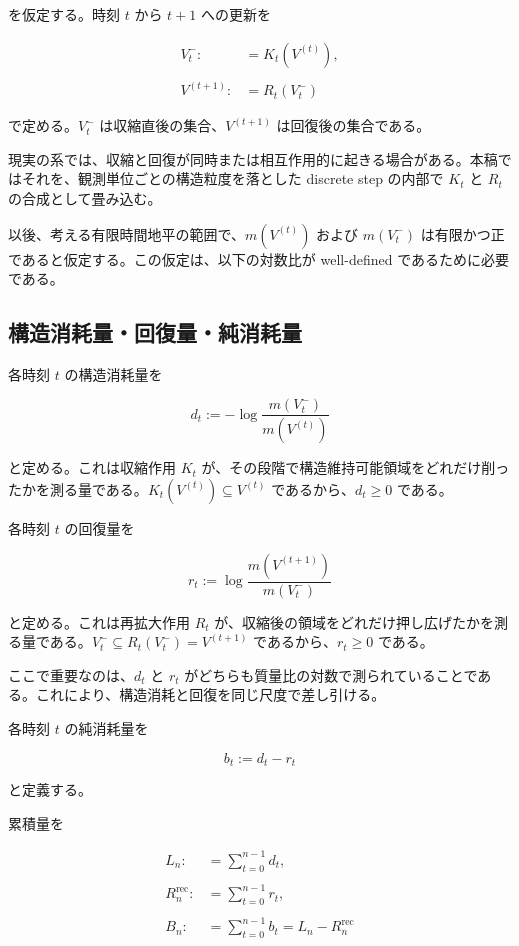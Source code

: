 \documentclass[12pt,a4paper]{article}
\begin{document}
を仮定する。時刻 \(t\) から \(t+1\) への更新を

\[
\begin{aligned}
V_{t}^- :&= K_{t}(V^{(t)}), \\
\qquad \\
V^{(t+1)} :&= R_{t}(V_{t}^-)
\end{aligned}
\]

で定める。\(V_{t}^-\) は収縮直後の集合、\(V^{(t+1)}\) は回復後の集合である。

現実の系では、収縮と回復が同時または相互作用的に起きる場合がある。本稿ではそれを、観測単位ごとの構造粒度を落とした discrete step の内部で \(K_{t}\) と \(R_{t}\) の合成として畳み込む。

以後、考える有限時間地平の範囲で、\(m(V^{(t)})\) および \(m(V_{t}^-)\) は有限かつ正であると仮定する。この仮定は、以下の対数比が well-defined であるために必要である。

\subsection{構造消耗量・回復量・純消耗量}\label{ux69cbux9020ux6d88ux8017ux91cfux56deux5fa9ux91cfux7d14ux6d88ux8017ux91cf}

各時刻 \(t\) の構造消耗量を

\[
d_{t} := -\log \frac{m(V_{t}^-)}{m(V^{(t)})}
\]

と定める。これは収縮作用 \(K_{t}\) が、その段階で構造維持可能領域をどれだけ削ったかを測る量である。\(K_{t}(V^{(t)})\subseteq V^{(t)}\) であるから、\(d_{t}\ge 0\) である。

各時刻 \(t\) の回復量を

\[
r_{t} := \log \frac{m(V^{(t+1)})}{m(V_{t}^-)}
\]

と定める。これは再拡大作用 \(R_{t}\) が、収縮後の領域をどれだけ押し広げたかを測る量である。\(V_{t}^- \subseteq R_{t}(V_{t}^-)=V^{(t+1)}\) であるから、\(r_{t}\ge 0\) である。

ここで重要なのは、\(d_{t}\) と \(r_{t}\) がどちらも質量比の対数で測られていることである。これにより、構造消耗と回復を同じ尺度で差し引ける。

\begin{definition}[純消耗量]
各時刻 $t$ の純消耗量を

$$
b_{t} := d_{t} - r_{t}
$$

と定義する。
\end{definition}

累積量を

\[
\begin{aligned}
L_{n} :&= \sum_{t=0}^{n-1} d_{t}, \\
\qquad \\
R_{n}^{\mathrm{rec}} :&= \sum_{t=0}^{n-1} r_{t}, \\
\qquad \\
B_{n} :&= \sum_{t=0}^{n-1} b_{t} = L_{n} - R_{n}^{\mathrm{rec}}
\end{aligned}
\]
\end{document}
